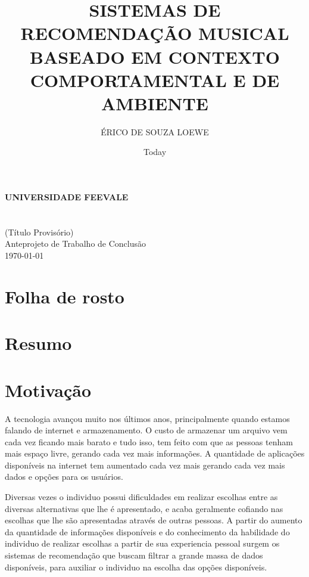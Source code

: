 \documentclass{article}
\title{SISTEMAS DE RECOMENDAÇÃO MUSICAL BASEADO EM CONTEXTO COMPORTAMENTAL E DE AMBIENTE}
\author{ÉRICO DE SOUZA LOEWE}
\date{Today}
\begin{document}
\makeatletter
\begin{titlepage}
   \begin{center}
      \large\textbf{
      UNIVERSIDADE FEEVALE\\
      \@author\\
      \@title\\
      }
      (Título Provisório)\\
      Anteprojeto de Trabalho de Conclusão\\
      \today
   \end{center}
\end{titlepage}
\makeatother

\section{Folha de rosto}
\newpage

\section{Resumo}
\newpage

\section{Motivação}

A tecnologia avançou muito nos últimos anos, principalmente quando estamos falando de internet e armazenamento. \cite{muraro2009avanccos} 
O custo de armazenar um arquivo vem cada vez ficando mais barato e tudo isso, tem feito com que as pessoas tenham mais espaço livre, gerando cada vez mais informações. \cite{ufc2020amagnetorresistencia} 
A quantidade de aplicações disponíveis na internet tem aumentado cada vez mais gerando cada vez mais dados e opções para os usuários. %

Diversas vezes o individuo possui dificuldades em realizar escolhas entre as diversas alternativas que lhe é apresentado, e acaba geralmente cofiando nas escolhas que lhe são apresentadas através de outras pessoas. \cite{resnick1997recommender} A partir do aumento da quantidade de informações disponíveis e do conhecimento da habilidade do individuo de realizar escolhas a partir de sua experiencia pessoal surgem os sistemas de recomendação que buscam filtrar a grande massa de dados disponíveis, para auxiliar o individuo na escolha das opções disponíveis.
\end{document}
